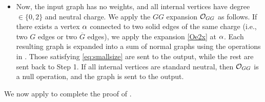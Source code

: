\begin{strategy}
\begin{itemize}
\item[Step 3:] Now, the input graph has no weights, and all internal vertices have degree $\in\{0,2\}$ and neutral charge. We apply the $GG$ expansion $\cal O_{GG}$ as follows. 
If there exists a vertex $\al$ connected to two solid edges of the same charge (i.e., two $G$ edges or two $\overline G$ edges), we apply the expansion \eqref{Oe2x} at $\al$.
Each resulting graph is expanded into a sum of normal graphs using the operations in . Those satisfying \eqref{eq:smallsize} are sent to the output, while the rest are sent back to Step 1.
If all internal vertices are standard neutral, then $\cal O_{GG}$ is a null operation, and the graph is sent to the output. 

\end{itemize}
\end{strategy}




We now apply  to complete the proof of .

